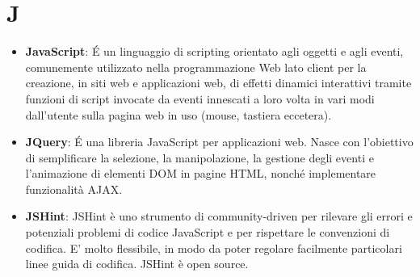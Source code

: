 \section{J}
\begin{itemize} 
	\item
	\textbf{JavaScript}: É un linguaggio di scripting orientato agli oggetti e agli eventi, comunemente utilizzato nella programmazione Web lato client per la creazione, in siti web e applicazioni web, di effetti dinamici interattivi tramite funzioni di script invocate da eventi innescati a loro volta in vari modi dall'utente sulla pagina web in uso (mouse, tastiera eccetera).
	\item
	\textbf{JQuery}: É una libreria JavaScript per applicazioni web. Nasce con l'obiettivo di semplificare la selezione, la manipolazione, la gestione degli eventi e l'animazione di elementi DOM in pagine HTML, nonché implementare funzionalità AJAX.
	\item
	\textbf{JSHint}: JSHint è uno strumento di community-driven per rilevare gli errori e potenziali problemi di codice JavaScript e per rispettare le convenzioni di codifica. E' molto flessibile, in modo da poter regolare facilmente particolari linee guida di codifica. JSHint è open source.
\end{itemize}